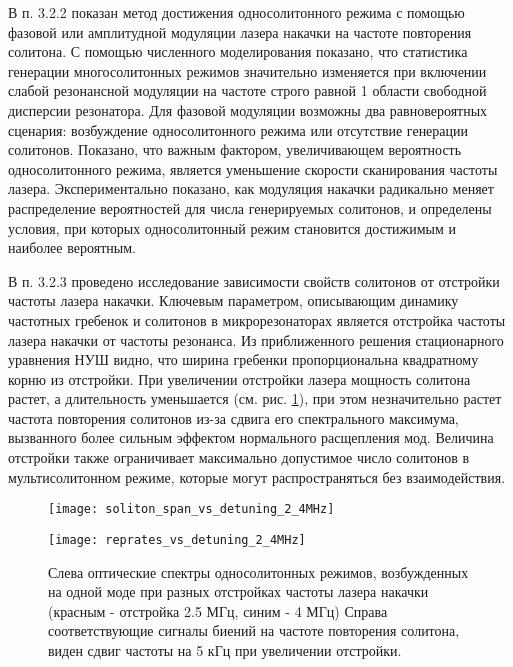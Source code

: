 В п. 3.2.2 показан метод достижения односолитонного режима с помощью фазовой или амплитудной модуляции лазера накачки на частоте повторения солитона. С помощью численного моделирования показано, что статистика генерации многосолитонных режимов значительно изменяется при включении слабой резонансной модуляции на частоте строго равной 1 области свободной дисперсии резонатора. Для фазовой модуляции возможны два равновероятных сценария: возбуждение односолитонного режима или отсутствие генерации солитонов. Показано, что важным фактором, увеличивающем вероятность односолитонного режима, является уменьшение скорости сканирования частоты лазера. Экспериментально показано, как модуляция накачки радикально меняет распределение вероятностей для числа генерируемых солитонов, и определены условия, при которых односолитонный режим становится достижимым и наиболее вероятным.

В п. 3.2.3 проведено исследование зависимости свойств солитонов от отстройки частоты лазера накачки. Ключевым параметром, описывающим динамику частотных гребенок и солитонов в микрорезонаторах является отстройка частоты лазера накачки от частоты резонанса. Из приближенного решения стационарного уравнения НУШ видно, что ширина гребенки пропорциональна квадратному корню из отстройки. При увеличении отстройки лазера мощность солитона растет, а длительность уменьшается (см. рис. \ref{detuning_dependant}), при этом незначительно растет частота повторения солитонов из-за сдвига его спектрального максимума, вызванного более сильным эффектом нормального расщепления мод. Величина отстройки также ограничивает максимально допустимое число солитонов в мультисолитонном режиме, которые могут распространяться без взаимодействия.

\begin{figure}[!htb]
  \begin{minipage}{0.49\linewidth}\centering
    \texttt{[image: soliton\_span\_vs\_detuning\_2\_4MHz]}
  \end{minipage}
  \hfill
  \begin{minipage}{0.49\linewidth}\centering
    \texttt{[image: reprates\_vs\_detuning\_2\_4MHz]}
  \end{minipage}
  \caption{Слева оптические спектры односолитонных режимов, возбужденных на одной моде при разных отстройках частоты лазера накачки (красным - отстройка 2.5 МГц, синим - 4 МГц) Справа соответствующие сигналы биений на частоте повторения солитона, виден сдвиг частоты на 5 кГц при увеличении отстройки.}
  \label{detuning_dependant}
\end{figure}

